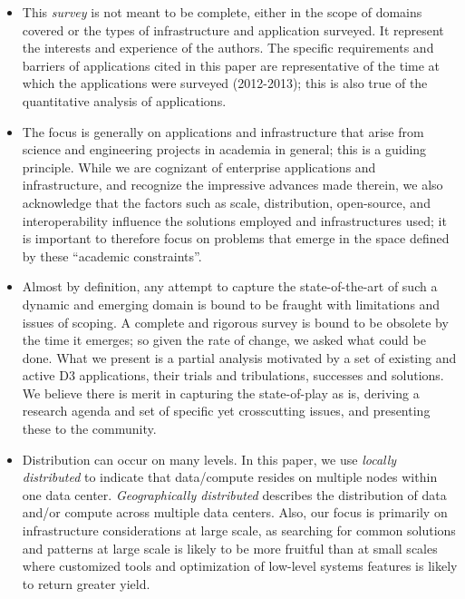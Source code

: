 \begin{itemize}

\item This {\it survey} is not meant to be complete, either in the scope of domains
  covered or the types of infrastructure and application surveyed.  It
  represent the interests and experience of the authors. The specific
  requirements and barriers of applications cited in this paper are
  representative of the time at which the applications were surveyed
  (2012-2013); this is also true of the quantitative analysis of applications.


\item The focus is generally on applications and infrastructure that arise from science
  and engineering projects in academia in general; this is a
  guiding principle.  While we are cognizant of enterprise applications and
  infrastructure, and recognize the impressive advances made therein, we also
  acknowledge that the factors such as scale, distribution, open-source, and
  interoperability influence the solutions employed and infrastructures used; it
  is important to therefore focus on problems that emerge in the space
  defined by these ``academic constraints''.

\item Almost by definition, any attempt to capture the state-of-the-art of such
  a dynamic and emerging domain is bound to be fraught with limitations and
  issues of scoping.  A complete and rigorous survey is bound to be obsolete by
  the time it emerges; so given the rate of change, we asked what could be
  done. What we present is a partial analysis motivated by a set of existing and
  active D3 applications, their trials and tribulations, successes and
  solutions. We believe there is merit in capturing the state-of-play as is,
  deriving a research agenda and set of specific yet crosscutting issues, and
  presenting these to the community.

\item Distribution can occur on many levels.  In this paper, we use {\em locally
    distributed} to indicate that data/compute resides on multiple nodes within
  one data center.  {\em Geographically distributed} describes the distribution
  of data and/or compute across multiple data centers.  Also, our focus is
  primarily on infrastructure considerations at  large scale, as searching
  for common solutions and patterns at  large scale is likely to be more
  fruitful than at small scales where customized tools and optimization of
  low-level systems features is likely to return greater yield.


\end{itemize}


